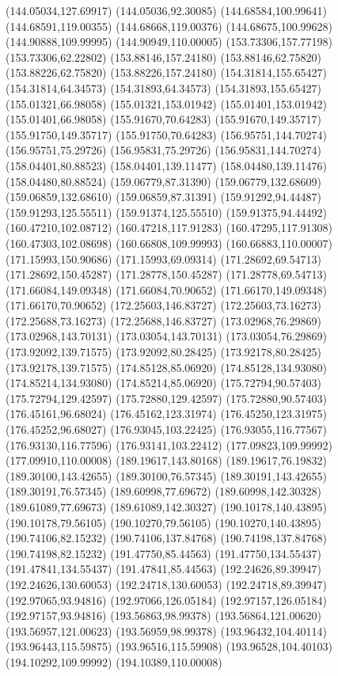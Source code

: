 {(144.05034,127.69917) (144.05036,92.30085) (144.68584,100.99641) (144.68591,119.00355) (144.68668,119.00376) (144.68675,100.99628) (144.90888,109.99995) (144.90949,110.00005)
(153.73306,157.77198) (153.73306,62.22802) (153.88146,157.24180) (153.88146,62.75820) (153.88226,62.75820) (153.88226,157.24180) (154.31814,155.65427) (154.31814,64.34573)
(154.31893,64.34573) (154.31893,155.65427) (155.01321,66.98058) (155.01321,153.01942) (155.01401,153.01942) (155.01401,66.98058) (155.91670,70.64283) (155.91670,149.35717)
(155.91750,149.35717) (155.91750,70.64283) (156.95751,144.70274) (156.95751,75.29726) (156.95831,75.29726) (156.95831,144.70274) (158.04401,80.88523) (158.04401,139.11477)
(158.04480,139.11476) (158.04480,80.88524) (159.06779,87.31390) (159.06779,132.68609) (159.06859,132.68610) (159.06859,87.31391) (159.91292,94.44487) (159.91293,125.55511)
(159.91374,125.55510) (159.91375,94.44492) (160.47210,102.08712) (160.47218,117.91283) (160.47295,117.91308) (160.47303,102.08698) (160.66808,109.99993) (160.66883,110.00007)
(171.15993,150.90686) (171.15993,69.09314) (171.28692,69.54713) (171.28692,150.45287) (171.28778,150.45287) (171.28778,69.54713) (171.66084,149.09348) (171.66084,70.90652)
(171.66170,149.09348) (171.66170,70.90652) (172.25603,146.83727) (172.25603,73.16273) (172.25688,73.16273) (172.25688,146.83727) (173.02968,76.29869) (173.02968,143.70131)
(173.03054,143.70131) (173.03054,76.29869) (173.92092,139.71575) (173.92092,80.28425) (173.92178,80.28425) (173.92178,139.71575) (174.85128,85.06920) (174.85128,134.93080)
(174.85214,134.93080) (174.85214,85.06920) (175.72794,90.57403) (175.72794,129.42597) (175.72880,129.42597) (175.72880,90.57403) (176.45161,96.68024) (176.45162,123.31974)
(176.45250,123.31975) (176.45252,96.68027) (176.93045,103.22425) (176.93055,116.77567) (176.93130,116.77596) (176.93141,103.22412) (177.09823,109.99992) (177.09910,110.00008)
(189.19617,143.80168) (189.19617,76.19832) (189.30100,143.42655) (189.30100,76.57345) (189.30191,143.42655) (189.30191,76.57345) (189.60998,77.69672) (189.60998,142.30328)
(189.61089,77.69673) (189.61089,142.30327) (190.10178,140.43895) (190.10178,79.56105) (190.10270,79.56105) (190.10270,140.43895) (190.74106,82.15232) (190.74106,137.84768)
(190.74198,137.84768) (190.74198,82.15232) (191.47750,85.44563) (191.47750,134.55437) (191.47841,134.55437) (191.47841,85.44563) (192.24626,89.39947) (192.24626,130.60053)
(192.24718,130.60053) (192.24718,89.39947) (192.97065,93.94816) (192.97066,126.05184) (192.97157,126.05184) (192.97157,93.94816) (193.56863,98.99378) (193.56864,121.00620)
(193.56957,121.00623) (193.56959,98.99378) (193.96432,104.40114) (193.96443,115.59875) (193.96516,115.59908) (193.96528,104.40103) (194.10292,109.99992) (194.10389,110.00008)
}
